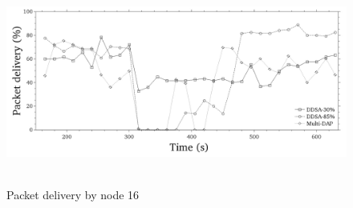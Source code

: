 \documentclass[conference]{IEEEtran}
\begin{document}
\begin{figure}[ht]
  \centering
  \mbox{
    \label{pdf-n16-per}{\includegraphics[scale=.21]{IEEE-consolidados/G-pdf-periodo-n16-2.jpg}}
  }
  \caption{Packet delivery by node 16}
  \label{pdf-n16-per}
\end{figure}
\end{document}
